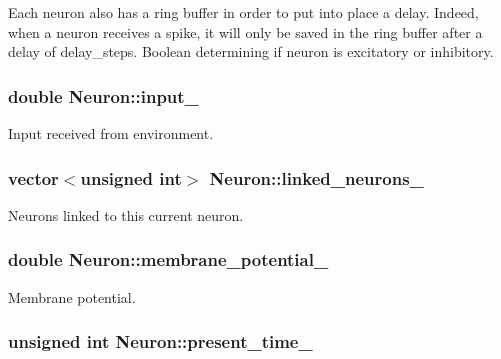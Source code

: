 Each neuron also has a ring buffer in order to put into place a delay. Indeed, when a neuron receives a spike, it will only be saved in the ring buffer after a delay of delay\-\_\-steps. Boolean determining if neuron is excitatory or inhibitory. \hypertarget{classNeuron_a9ed47eb032d964fdebc77bca888226fa}{
\subsubsection[{input\-\_\-}]{\setlength{\rightskip}{0pt plus 5cm}double Neuron\-::input\-\_\-\hspace{0.3cm}{\ttfamily [private]}}}\label{classNeuron_a9ed47eb032d964fdebc77bca888226fa}
Input received from environment. \hypertarget{classNeuron_a71f410f0b2026456ab554bfb6f1b4b9e}{
\subsubsection[{linked\-\_\-neurons\-\_\-}]{\setlength{\rightskip}{0pt plus 5cm}vector$<$unsigned int$>$ Neuron\-::linked\-\_\-neurons\-\_\-\hspace{0.3cm}{\ttfamily [private]}}}\label{classNeuron_a71f410f0b2026456ab554bfb6f1b4b9e}
Neurons linked to this current neuron. \hypertarget{classNeuron_a58829bf280bb52776e8842c71a92af4a}{
\subsubsection[{membrane\-\_\-potential\-\_\-}]{\setlength{\rightskip}{0pt plus 5cm}double Neuron\-::membrane\-\_\-potential\-\_\-\hspace{0.3cm}{\ttfamily [private]}}}\label{classNeuron_a58829bf280bb52776e8842c71a92af4a}
Membrane potential. \hypertarget{classNeuron_a392877d74e2b7f46002cf8576c13c384}{
\subsubsection[{present\-\_\-time\-\_\-}]{\setlength{\rightskip}{0pt plus 5cm}unsigned int Neuron\-::present\-\_\-time\-\_\-\hspace{0.3cm}{\ttfamily [private]}}}\label{classNeuron_a392877d74e2b7f46002cf8576c13c384}
